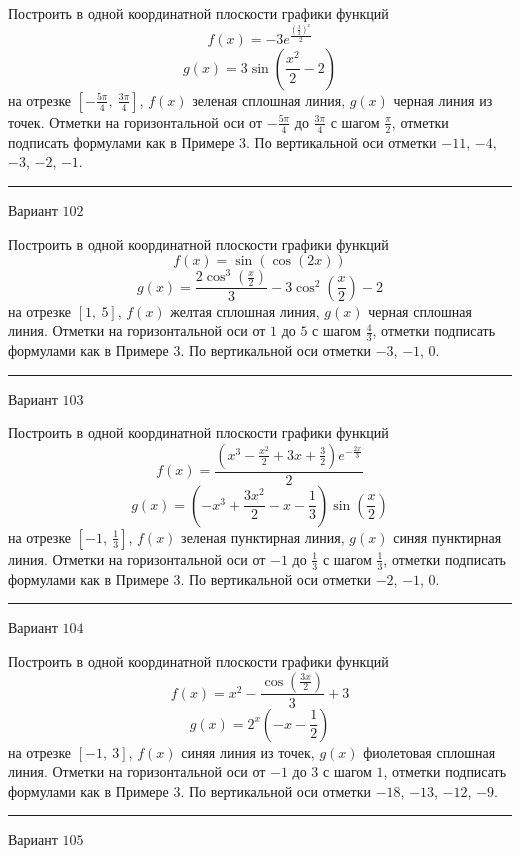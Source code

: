 \documentclass[11pt]{report}
\begin{document}
Построить в одной координатной плоскости графики функций $$f(x) = - 3 e^{\frac{\left(\frac{3}{2}\right)^{x}}{2}}$$ $$g(x) = 3 \sin{\left(\frac{x^{2}}{2} - 2 \right)}$$ на отрезке $\left[- \frac{5 \pi}{4}, \  \frac{3 \pi}{4}\right]$, $f(x)$ зеленая сплошная линия, $g(x)$ черная линия из точек. Отметки на горизонтальной оси от $- \frac{5 \pi}{4}$ до $\frac{3 \pi}{4}$ с шагом $\frac{\pi}{2}$, отметки подписать формулами как в Примере 3. По вертикальной оси отметки $-11$, $-4$, $-3$, $-2$, $-1$.
\begin{center}
\noindent\rule{8cm}{0.4pt}
\end{center}
Вариант $102$


Построить в одной координатной плоскости графики функций $$f(x) = \sin{\left(\cos{\left(2 x \right)} \right)}$$ $$g(x) = \frac{2 \cos^{3}{\left(\frac{x}{2} \right)}}{3} - 3 \cos^{2}{\left(\frac{x}{2} \right)} - 2$$ на отрезке $\left[1, \  5\right]$, $f(x)$ желтая сплошная линия, $g(x)$ черная сплошная линия. Отметки на горизонтальной оси от $1$ до $5$ с шагом $\frac{4}{3}$, отметки подписать формулами как в Примере 3. По вертикальной оси отметки $-3$, $-1$, $0$.
\begin{center}
\noindent\rule{8cm}{0.4pt}
\end{center}
Вариант $103$


Построить в одной координатной плоскости графики функций $$f(x) = \frac{\left(x^{3} - \frac{x^{2}}{2} + 3 x + \frac{3}{2}\right) e^{- \frac{2 x}{3}}}{2}$$ $$g(x) = \left(- x^{3} + \frac{3 x^{2}}{2} - x - \frac{1}{3}\right) \sin{\left(\frac{x}{2} \right)}$$ на отрезке $\left[-1, \  \frac{1}{3}\right]$, $f(x)$ зеленая пунктирная линия, $g(x)$ синяя пунктирная линия. Отметки на горизонтальной оси от $-1$ до $\frac{1}{3}$ с шагом $\frac{1}{3}$, отметки подписать формулами как в Примере 3. По вертикальной оси отметки $-2$, $-1$, $0$.
\begin{center}
\noindent\rule{8cm}{0.4pt}
\end{center}
Вариант $104$


Построить в одной координатной плоскости графики функций $$f(x) = x^{2} - \frac{\cos{\left(\frac{3 x}{2} \right)}}{3} + 3$$ $$g(x) = 2^{x} \left(- x - \frac{1}{2}\right)$$ на отрезке $\left[-1, \  3\right]$, $f(x)$ синяя линия из точек, $g(x)$ фиолетовая сплошная линия. Отметки на горизонтальной оси от $-1$ до $3$ с шагом $1$, отметки подписать формулами как в Примере 3. По вертикальной оси отметки $-18$, $-13$, $-12$, $-9$.
\begin{center}
\noindent\rule{8cm}{0.4pt}
\end{center}
Вариант $105$
\end{document}
